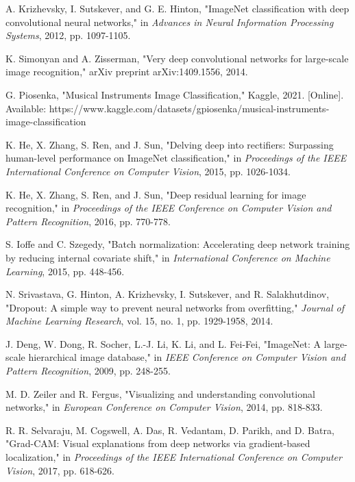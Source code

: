\begin{thebibliography}{00}
 A. Krizhevsky, I. Sutskever, and G. E. Hinton, "ImageNet classification with deep convolutional neural networks," in \textit{Advances in Neural Information Processing Systems}, 2012, pp. 1097-1105.

 K. Simonyan and A. Zisserman, "Very deep convolutional networks for large-scale image recognition," arXiv preprint arXiv:1409.1556, 2014.

 G. Piosenka, "Musical Instruments Image Classification," Kaggle, 2021. [Online]. Available: https://www.kaggle.com/datasets/gpiosenka/musical-instruments-image-classification

 K. He, X. Zhang, S. Ren, and J. Sun, "Delving deep into rectifiers: Surpassing human-level performance on ImageNet classification," in \textit{Proceedings of the IEEE International Conference on Computer Vision}, 2015, pp. 1026-1034.

 K. He, X. Zhang, S. Ren, and J. Sun, "Deep residual learning for image recognition," in \textit{Proceedings of the IEEE Conference on Computer Vision and Pattern Recognition}, 2016, pp. 770-778.

 S. Ioffe and C. Szegedy, "Batch normalization: Accelerating deep network training by reducing internal covariate shift," in \textit{International Conference on Machine Learning}, 2015, pp. 448-456.

 N. Srivastava, G. Hinton, A. Krizhevsky, I. Sutskever, and R. Salakhutdinov, "Dropout: A simple way to prevent neural networks from overfitting," \textit{Journal of Machine Learning Research}, vol. 15, no. 1, pp. 1929-1958, 2014.

 J. Deng, W. Dong, R. Socher, L.-J. Li, K. Li, and L. Fei-Fei, "ImageNet: A large-scale hierarchical image database," in \textit{IEEE Conference on Computer Vision and Pattern Recognition}, 2009, pp. 248-255.

 M. D. Zeiler and R. Fergus, "Visualizing and understanding convolutional networks," in \textit{European Conference on Computer Vision}, 2014, pp. 818-833.

 R. R. Selvaraju, M. Cogswell, A. Das, R. Vedantam, D. Parikh, and D. Batra, "Grad-CAM: Visual explanations from deep networks via gradient-based localization," in \textit{Proceedings of the IEEE International Conference on Computer Vision}, 2017, pp. 618-626.


\end{thebibliography}
